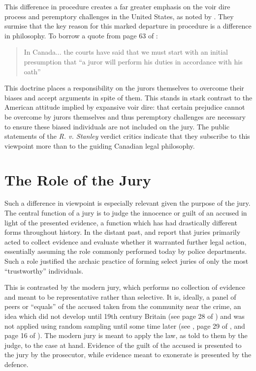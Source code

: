 This difference in procedure creates a far greater emphasis on the voir dire process and peremptory challenges in the United
States, as noted by \cite{hansvidjudging}. They surmise that the key reason for this marked departure in procedure is a difference
in philosophy. To borrow a quote from page 63 of \cite{hansvidjudging}:

\begin{quote}
  In Canada... the courts have said that we must start with an initial presumption that ``a juror will perform his
  duties in accordance with his oath''
\end{quote}

This doctrine places a responsibility on the jurors themselves to overcome their biases and accept arguments in spite of
them. This stands in stark contrast to the American attitude implied by expansive voir dire: that certain prejudice cannot be
overcome by jurors themselves and thus peremptory challenges are necessary to ensure these biased individuals are not included on
the jury. The public statements of the \textit{R. v. Stanley} verdict critics indicate that they subscribe to this viewpoint more
than to the guiding Canadian legal philosophy. 

\section{The Role of the Jury} \label{sec:rolejur}

Such a difference in viewpoint is especially relevant given the purpose of the jury. The central function of a jury is to judge
the innocence or guilt of an accused in light of the presented evidence, a function which has had drastically different forms
throughout history. In the distant past, \cite{vonmosch1921} and \cite{hoffman1997} report that juries primarily acted to collect
evidence and evaluate whether it warranted further legal action, essentially assuming the role commonly performed today by police
departments. Such a role justified the archaic practice of forming select juries of only the most ``trustworthy'' individuals.

This is contrasted by the modern jury, which performs no collection of evidence and meant to be representative rather than
selective. It is, ideally, a panel of peers or ``equals'' of the accused taken from the community near the crime, an idea which
did not develop until 19th century Britain (see page 28 of \cite{hansvidjudging}) and was not applied using random sampling until
some time later (see \cite{hoffman1997}, page 29 of \cite{hansvidjudging}, and page 16 of \cite{vandykejurysel}). The modern jury
is meant to apply the law, as told to them by the judge\footnotemark, to the case at hand. Evidence of the guilt of the accused is
presented to the jury by the prosecutor, while evidence meant to exonerate is presented by the defence.

